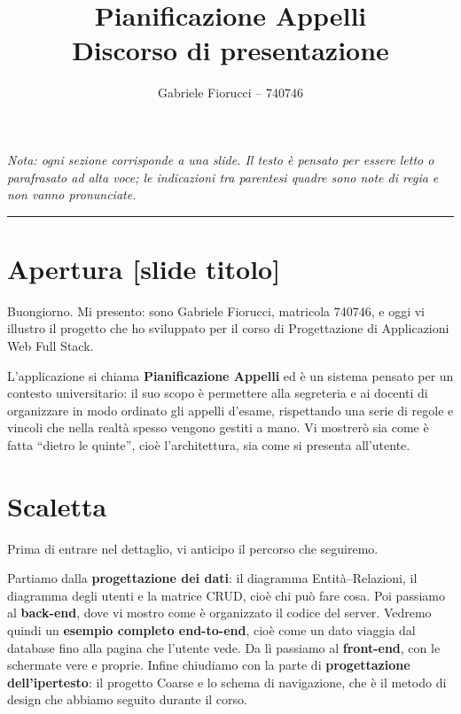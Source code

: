 \documentclass[11pt]{article}
\title{\vspace{-1.5cm}\textbf{Pianificazione Appelli}\\[0.3em]
\large Discorso di presentazione}
\author{Gabriele Fiorucci -- 740746}
\date{}
\begin{document}
\maketitle
\thispagestyle{empty}

\noindent\textit{Nota: ogni sezione corrisponde a una slide. Il testo è pensato per essere
letto o parafrasato ad alta voce; le indicazioni tra parentesi quadre sono note di regia
e non vanno pronunciate.}

\vspace{0.5em}
\hrule
\vspace{1em}

\section*{Apertura [slide titolo]}

Buongiorno. Mi presento: sono Gabriele Fiorucci, matricola 740746, e oggi vi illustro
il progetto che ho sviluppato per il corso di Progettazione di Applicazioni Web Full Stack.

L'applicazione si chiama \textbf{Pianificazione Appelli} ed è un sistema pensato per un
contesto universitario: il suo scopo è permettere alla segreteria e ai docenti di
organizzare in modo ordinato gli appelli d'esame, rispettando una serie di regole e
vincoli che nella realtà spesso vengono gestiti a mano. Vi mostrerò sia come è fatta
``dietro le quinte'', cioè l'architettura, sia come si presenta all'utente.

\section*{Scaletta}

Prima di entrare nel dettaglio, vi anticipo il percorso che seguiremo.

Partiamo dalla \textbf{progettazione dei dati}: il diagramma Entità--Relazioni, il
diagramma degli utenti e la matrice CRUD, cioè chi può fare cosa. Poi passiamo al
\textbf{back-end}, dove vi mostro come è organizzato il codice del server. Vedremo
quindi un \textbf{esempio completo end-to-end}, cioè come un dato viaggia dal database
fino alla pagina che l'utente vede. Da lì passiamo al \textbf{front-end}, con le
schermate vere e proprie. Infine chiudiamo con la parte di \textbf{progettazione
dell'ipertesto}: il progetto Coarse e lo schema di navigazione, che è il metodo di
design che abbiamo seguito durante il corso.
\end{document}
